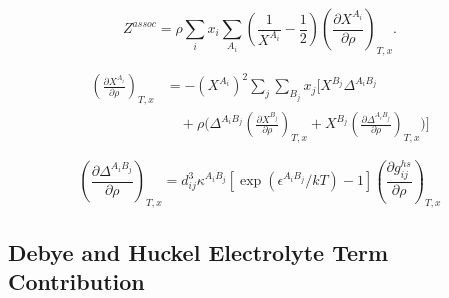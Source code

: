 \documentclass[12pt, letterpaper]{article}
\begin{document}
\begin{equation}
    Z^{assoc}=\rho\sum_{i}x_{i}\sum_{A_{i}}\left(\frac{1}{X^{A_{i}}}-\frac{1}{2}\right)\left(\frac{\partial X^{A_{i}}}{\partial\rho}\right)_{T,x}.
    \label{eq:z_assoc_explicit}
\end{equation}


\begin{equation}
    \begin{aligned}
        \left(\frac{\partial X^{A_{i}}}{\partial\rho}\right)_{T,x}
        &=-(X^{A_{i}})^{2}\sum_{j}\sum_{B_{j}}x_{j}
        \Bigg[
        X^{B_{j}}\Delta^{A_{i}B_{j}}
        \\
        &\quad +\rho\Bigg(
        \Delta^{A_{i}B_{j}}\left(\frac{\partial X^{B_{j}}}{\partial\rho}\right)_{T,x}
        +X^{B_{j}}\left(\frac{\partial\Delta^{A_{i}B_{j}}}{\partial\rho}\right)_{T,x}
        \Bigg)
        \Bigg]
    \end{aligned}
    \label{eq:dx_assoc_drho}
\end{equation}


\begin{equation}
    \left(\frac{\partial\Delta^{A_{i}B_{j}}}{\partial\rho}\right)_{T,x}=d_{ij}^3\kappa^{A_{i}B_{j}}\left[\exp(\epsilon^{A_{i}B_{j}}/kT)-1\right]\left(\frac{\partial g_{ij}^{hs}}{\partial\rho}\right)_{T,x}
    \label{eq:ddelta_assoc_drho}
\end{equation}


\subsection{Debye and Huckel Electrolyte Term Contribution}

\end{document}
